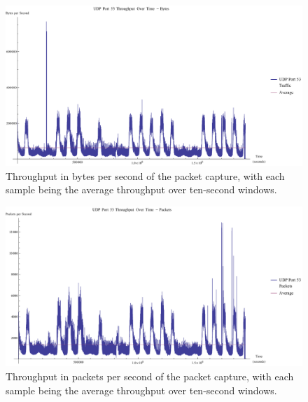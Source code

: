 \documentclass[12pt]{report}
\theoremstyle{remark}
\theoremstyle{definition}
\theoremstyle{definition}
\theoremstyle{definition}
\begin{document}
\begin{appendices}
\begin{figure}
\centering
\includegraphics[width=\textwidth]{figures/pcap-tpb.pdf}
\caption[Throughput in Bytes per Second of Packet Capture]{Throughput in bytes per second of the packet capture, with each sample being the average throughput over ten-second windows.}
\label{cplot}
\end{figure}

\begin{figure}
\centering
\includegraphics[width=\textwidth]{figures/pcap-tpp.pdf}
\caption[Throughput in Packets per Second of Packet Capture]{Throughput in packets per second of the packet capture, with each sample being the average throughput over ten-second windows.}
\label{cplot}
\end{figure}





\end{appendices}
\end{document}
